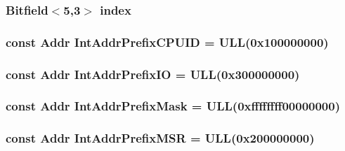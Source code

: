\label{namespaceX86ISA_a1c3adbc67ce574fe545e332d3bc677be}
\hypertarget{namespaceX86ISA_aa7f971ede8ba06dbd8a605007eda1c6f}{
\subsubsection[{index}]{\setlength{\rightskip}{0pt plus 5cm}Bitfield$<$5,3$>$ {\bf index}}}
\label{namespaceX86ISA_aa7f971ede8ba06dbd8a605007eda1c6f}
\hypertarget{namespaceX86ISA_a19b7531b77e7cc62c0f9fc6ef2d533ff}{
\subsubsection[{IntAddrPrefixCPUID}]{\setlength{\rightskip}{0pt plus 5cm}const {\bf Addr} {\bf IntAddrPrefixCPUID} = ULL(0x100000000)}}
\label{namespaceX86ISA_a19b7531b77e7cc62c0f9fc6ef2d533ff}
\hypertarget{namespaceX86ISA_af68ed0db853c56ca0bc7d0761c54d275}{
\subsubsection[{IntAddrPrefixIO}]{\setlength{\rightskip}{0pt plus 5cm}const {\bf Addr} {\bf IntAddrPrefixIO} = ULL(0x300000000)}}
\label{namespaceX86ISA_af68ed0db853c56ca0bc7d0761c54d275}
\hypertarget{namespaceX86ISA_a62621fac9b93ee845449884ed6837442}{
\subsubsection[{IntAddrPrefixMask}]{\setlength{\rightskip}{0pt plus 5cm}const {\bf Addr} {\bf IntAddrPrefixMask} = ULL(0xffffffff00000000)}}
\label{namespaceX86ISA_a62621fac9b93ee845449884ed6837442}
\hypertarget{namespaceX86ISA_ad4c44000b725a32955ce5a71dd748d6c}{
\subsubsection[{IntAddrPrefixMSR}]{\setlength{\rightskip}{0pt plus 5cm}const {\bf Addr} {\bf IntAddrPrefixMSR} = ULL(0x200000000)}}
